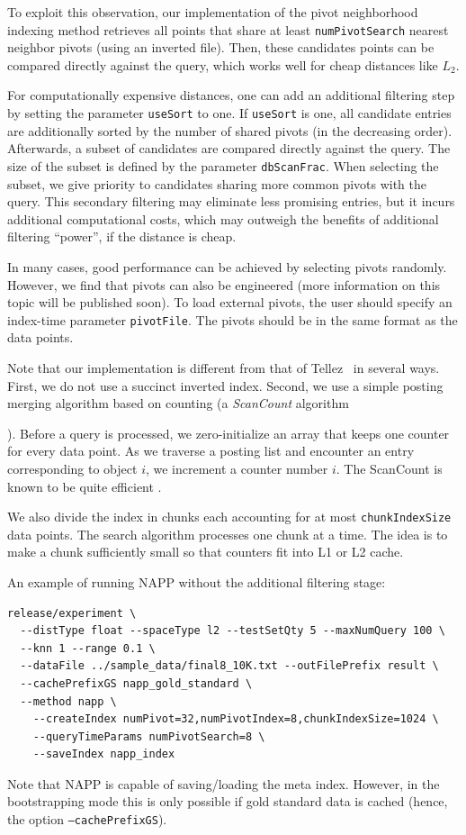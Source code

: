 \documentclass[runningheads,a4paper]{llncs}
\newcommand{\ttt}[1]{\texttt{#1}}
\begin{document}
{To exploit this observation, our implementation of the pivot neighborhood indexing method retrieves all points that 
share at least \ttt{numPivotSearch} nearest neighbor pivots (using an inverted file).
Then, these candidates points can be compared directly against the query,
which works well for cheap distances like $L_2$.

For computationally expensive distances, one can add an additional filtering step by
setting the parameter \ttt{useSort} to one.
If \ttt{useSort} is one, all candidate entries are additionally sorted by the number of shared pivots
(in the decreasing order).
Afterwards, a subset of candidates are compared directly against the query. 
The size of the subset is defined by the parameter \ttt{dbScanFrac}.
When selecting the subset, we give priority to candidates sharing more common pivots with the query. 
This secondary filtering may eliminate less promising entries, but it incurs additional
computational costs, which may outweigh the benefits of additional filtering ``power'', if the distance is cheap.

In many cases, good performance can be achieved by selecting pivots randomly. However, we find
that pivots can also be engineered (more information on this topic will be published soon). 
To load external pivots, the user should specify
an index-time parameter \ttt{pivotFile}. The pivots should be in the same format as the data points.

Note that our implementation is different from that of Tellez~\cite{tellez2013succinct} in several ways.
First, we do not use a succinct inverted index. Second, we use a simple posting merging algorithm
based on counting (a \emph{ScanCount} algorithm}). 
Before a query is processed, we zero-initialize an array that keeps one
counter for every data point. As we traverse a posting list and encounter an entry corresponding to object
$i$, we increment a counter number $i$.
The ScanCount is known to be quite efficient \cite{li2008efficient}.

We also divide the index in chunks each accounting for at most \ttt{chunkIndexSize} data points.
The search algorithm processes one chunk at a time. The idea is to make a chunk sufficiently small
so that counters fit into L1 or L2  cache.

An example of running NAPP without the additional filtering stage:
{
\footnotesize
\begin{verbatim}
release/experiment \
  --distType float --spaceType l2 --testSetQty 5 --maxNumQuery 100 \
  --knn 1 --range 0.1 \
  --dataFile ../sample_data/final8_10K.txt --outFilePrefix result \
  --cachePrefixGS napp_gold_standard \
  --method napp \
    --createIndex numPivot=32,numPivotIndex=8,chunkIndexSize=1024 \
    --queryTimeParams numPivotSearch=8 \
    --saveIndex napp_index
\end{verbatim}
}
Note that NAPP is capable of saving/loading the meta index. However, in the bootstrapping
mode this is only possible if gold standard data is cached (hence, the option \ttt{--cachePrefixGS}).
\end{document}
